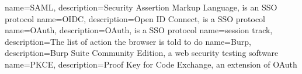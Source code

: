 

{
    name=SAML,
    description={Security Assertion Markup Language, is an SSO protocol}
}
{
    name=OIDC,
    description={Open ID Connect, is a SSO protocol} 
}
{
    name=OAuth,
    description={OAuth, is a SSO protocol}
}
{
    name=session track,
    description={The list of action the browser is told to do}
}
{
    name=Burp,
    description={Burp Suite Community Edition, a web security testing software}
}
{
    name=PKCE,
    description={Proof Key for Code Exchange, an extension of OAuth}
}


\makeglossaries